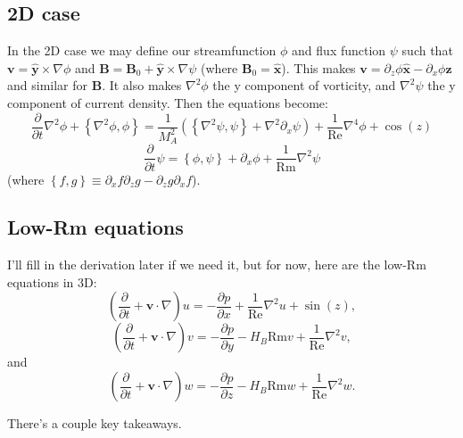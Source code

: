 \documentclass[aps,pop,preprint]{revtex4}
\newcommand{\Rm}{\mathrm{Rm}}
\renewcommand{\Re}{\mathrm{Re}}
\begin{document}
	\subsection{2D case} \label{derivation:subsec:2d}
	In the 2D case we may define our streamfunction $\phi$ and flux function $\psi$ such that $\mathbf{v} = \hat{\mathbf{y}} \times \nabla \phi$ and $\mathbf{B} = \mathbf{B}_0 + \hat{\mathbf{y}} \times \nabla \psi$ (where $\mathbf{B}_0 = \hat{\mathbf{x}}$). 
	This makes $\mathbf{v} = \partial_z \phi \hat{\mathbf{x}} - \partial_x \phi \hat{\mathbf{z}}$ and similar for $\mathbf{B}$. 
	It also makes $\nabla^2 \phi$ the y component of vorticity, and $\nabla^2 \psi$ the y component of current density. 
	Then the equations become:
	\begin{equation}
	\frac{\partial}{\partial t} \nabla^2 \phi + \left\{\nabla^2 \phi, \phi \right\} = \frac{1}{M_A^2}\left(\left\{\nabla^2 \psi, \psi \right\} + \nabla^2 \partial_x \psi \right) + \frac{1}{\mathrm{Re}}\nabla^4 \phi + \cos(z)
	\end{equation}
	\begin{equation}
	\frac{\partial}{\partial t} \psi = \left\{ \phi, \psi \right\} + \partial_x \phi + \frac{1}{\mathrm{Rm}}\nabla^2 \psi
	\end{equation}
	(where $\left\{f, g\right\} \equiv \partial_x f \partial_z g - \partial_z g \partial_x f$).
	
	\subsection{Low-Rm equations} \label{derivation:subsec:lowRm}
	I'll fill in the derivation later if we need it, but for now, here are the low-$\Rm$ equations in 3D:
	\begin{equation}
	\left( \frac{\partial}{\partial t} + \mathbf{v} \cdot \nabla \right) u = - \frac{\partial p}{\partial x} + \frac{1}{\Re} \nabla^2 u + \sin (z),
	\end{equation}
	\begin{equation}
	\left( \frac{\partial}{\partial t} + \mathbf{v} \cdot \nabla \right) v = - \frac{\partial p}{\partial y} - H_B \Rm v + \frac{1}{\Re} \nabla^2 v,
	\end{equation}
	and
	\begin{equation}
	\left( \frac{\partial}{\partial t} + \mathbf{v} \cdot \nabla \right) w = - \frac{\partial p}{\partial z} - H_B \Rm w + \frac{1}{\Re} \nabla^2 w.
	\end{equation}
	
There's a couple key takeaways. 
\end{document}
